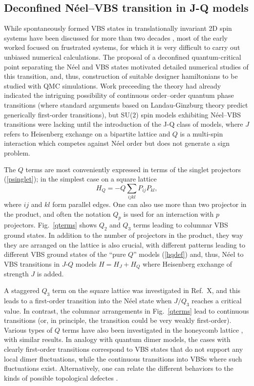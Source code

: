 \documentclass[range]{ar2e}
\begin{document}
\subsection{Deconfined N\'eel--VBS transition in J-Q models}
\label{ss:jq2}
While spontaneously formed VBS states in translationally invariant 2D spin systems have been discussed for more than two decades \cite{Chandra88,Dagotto89,Read89},
most of the early worked focused on frustrated systems, for which it is very difficult to carry out unbiased numerical calculations. The proposal of a deconfined 
quantum-critical point separating the N\'eel and VBS states motivated detailed numerical studies of this transition, and, thus, construction of suitable designer 
hamiltonians to be studied with QMC simulations. Work preceeding the theory had already indicated the intriguing possibility of continuous order--order quantum 
phase transitions (where standard arguments based on Landau-Ginzburg theory predict generically first-order transitions), but SU($2$) spin models exhibiting 
N\'eel--VBS transitions were lacking until the introduction of the J-Q class of models, where $J$ refers to Heisenberg exchange on a bipartite lattice and $Q$ is 
a multi-spin interaction which competes against N\'eel order but does not generate a sign problem. 

The $Q$ terms are most conveniently expressed in terms of the singlet projectors (\ref{psinglet}); in the simplest case on a square lattice
\begin{equation}
H_Q = - Q\sum_{ijkl} P_{ij}P_{kl},
\label{hqdef}
\end{equation}
where $ij$ and $kl$ form parallel edges. One can also use more than two projector in the product, and often the notation $Q_p$ is used for an 
interaction with $p$ projectors. Fig.~\ref{qterms} shows $Q_2$ and $Q_3$ terms leading to columnar VBS ground states. In addition to the number
of projectors in the product, they way they are arranged on the lattice is also crucial, with different patterns leading to different VBS ground
states of the ``pure $Q$'' models (\ref{hqdef}) and, thus, N\'eel to VBS transitions in $J$-$Q$ models $H=H_J+H_Q$ where Heisenberg exchange of
strength $J$ is added.

A staggered $Q_3$ term on the square lattice was investigated in Ref.~X, and this leads to a first-order transition into the N\'eel state when
$J/Q_3$ reaches a critical value. In contrast, the columnar arrangements in Fig.~\ref{qterms} lead to continuous transitions (or, in principle,
the transition could be very weakly first-order). Various types of $Q$ terms have also been investigated in the honeycomb lattice \cite{Banerjee11}, 
with similar results. In analogy with quantum dimer models, the cases with clearly first-order transitions correspond to VBS states that do not
support any local dimer fluctuations, while the continuous transitions into VBSs where such fluctuations exist. Alternatively, one can relate
the different behaviors to the kinds of possible topological defectes \cite{Banerjee11}.
\end{document}
